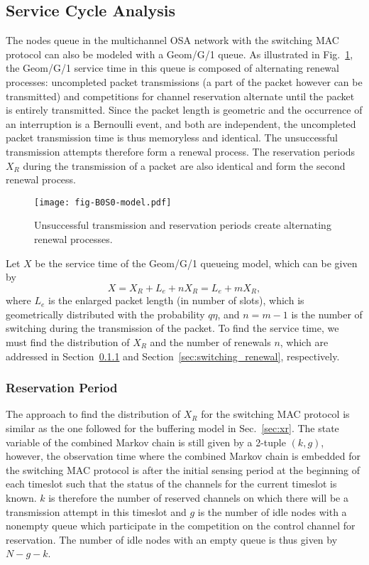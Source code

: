 \documentclass[12pt,journal,oneside,onecolumn]{IEEEtran}
\begin{document}
\subsection{Service Cycle Analysis}
\label{sec:switching_service_cycle}

The nodes queue in the multichannel OSA network with the switching MAC protocol can 
also be modeled with a Geom/G/1 queue. 
As illustrated in Fig.~\ref{fig-B0S0-model.pdf}, the Geom/G/1 service time in this queue is composed of alternating renewal processes: 
uncompleted packet transmissions (a part of the packet however can be transmitted) 
and competitions for channel reservation alternate until the packet is entirely transmitted. 
Since the packet length is geometric and the occurrence of an interruption is a Bernoulli event, and both are independent, the uncompleted packet transmission time is thus memoryless and identical. The unsuccessful transmission attempts therefore form a renewal process.
The reservation periods $X_R$ during the transmission 
of a packet are also identical and form the second renewal process. 
\begin{figure}\texttt{[image: fig-B0S0-model.pdf]}\caption{Unsuccessful transmission and reservation periods create alternating renewal processes.}\label{fig-B0S0-model.pdf}\end{figure}
Let $X$ be the service time of the Geom/G/1 queueing model, which can be given by
\begin{equation}
X=X_R+L_e+n X_R = L_e+ m X_R,
\label{eq:}
\end{equation}
where $L_e$ is the enlarged packet length (in number of slots), 
which is geometrically distributed with 
the probability $q \eta$, 
and $n=m-1$ is the number of switching during the transmission 
of the packet. To find the service time, we must find the distribution of $X_R$ and the number of renewals $n$, 
which are addressed in Section~\ref{sec:switching_X_R} and Section~\ref{sec:switching_renewal}, respectively.

\subsubsection{Reservation Period}
\label{sec:switching_X_R}

The approach to find the distribution of $X_R$ for the switching MAC protocol is similar as the one followed
for the buffering model in Sec.~\ref{sec:xr}.
The state variable of the combined Markov chain is still 
given by a 2-tuple $(k,g)$, 
however,  the observation time where the combined Markov chain is 
embedded for the switching MAC protocol is after the 
initial sensing period at the beginning of each timeslot such that the status of the channels 
for the current timeslot is known. 
$k$ is therefore the number of reserved channels
on which there will be a transmission attempt in this timeslot and $g$ is the number
of idle nodes 
with a nonempty queue which participate in the competition on the control channel for reservation.
The number of idle nodes with an empty queue is thus given 
by $N-g-k$. 
\end{document}
